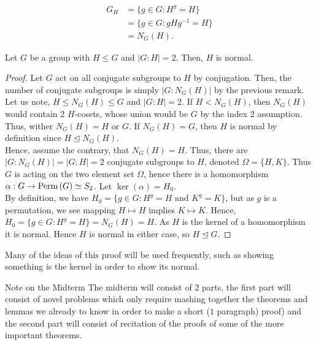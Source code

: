 \begin{align*}
	G_{H} &= \{g \in G : H^{g} = H\} \\
	      &= \{g \in G : gHg^{-1} = H\} \\
	      &= N_{G}\left( H \right)
.\end{align*}
\begin{theorem}
	Let \(G\) be a group with \(H\le G\) and \(\left| G : H \right| = 2\). Then, \(H\) is normal.
\end{theorem}
\begin{proof}
	Let \(G\) act on all conjugate subgroups to \(H\) by conjugation. Then, the number of conjugate subgroups is simply \(\left| G : N_{G}\left( H \right)  \right| \) by the previous remark. Let us note, \(H \le N_{G}\left( H \right) \le G \) and \(\left| G : H \right| = 2\). If \(H < N_{G}\left( H \right) \), then \(N_{G}\left( H \right) \) would contain \(2\) \(H\)-cosets, whose union would be \(G\) by the index \(2\) assumption. Thus, wither \(N_{G}\left( H \right)  = H \text{ or } G\). If \(N_{G}\left( H \right) = G\), then \(H\) is normal by definition since \(H\trianglelefteq N_{G}\left( H \right) \).
	\\ Hence, assume the contrary, that \(N_{G}\left( H \right) = H\). Thus, there are \(\left| G: N_{G} \left( H \right)  \right|  = \left| G : H \right| = 2\) conjugate subgroups to \(H\), denoted \(\Omega = \{H, K\} \). Thus \(G\) is acting on the two element set \(\Omega\), hence there is a homomorphism \(\alpha: G \to \operatorname{Perm} \left( G \right) \simeq S_2\). Let \(\ker \left( \alpha \right) = H_0\).\\
	By definition, we have \(H_0 = \{g \in G : H^{g} = H \text{ and } K^{g} = K\} \), but as \(g\) is a permutation, we see mapping \(H \mapsto H\) implies \(K\mapsto K\). Hence, \(H_0 = \{g \in G : H^{g} = H\} = N_{G}\left( H \right) = H\). As \(H\) is the kernel of a homomorphism it is normal. Hence \(H\) is normal in either case, so \(H \trianglelefteq G\).
\end{proof}
Many of the ideas of this proof will be used frequently, such as showing something is the kernel in order to show its normal.
\begin{note}{Note on the Midterm}
	The midterm will consist of \(2\) parts, the first part will consist of novel problems which only require mashing together the theorems and lemmas we already to know in order to make a short (\(1\) paragraph) proof) and the second part will consist of recitation of the proofs of some of the more important theorems.
\end{note}
